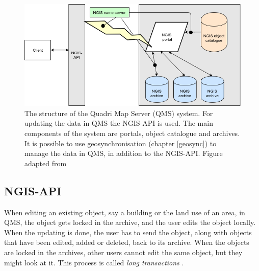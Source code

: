 \begin{figure}[H]
	\centering
	\includegraphics[scale=0.5]{img/ngiss.png}
	\caption{The structure of the Quadri Map Server (QMS) system. For updating the data in QMS the NGIS-API is used.  The main components of the system are portals, object catalogue and archives. It is possible to use geosynchronisation (chapter \ref{geosync}) to manage the data in QMS, in addition to the NGIS-API. Figure adapted from \citep{Kartverket2017b} }
	\label{fig:qmsfig}
\end{figure}

\subsection{NGIS-API}

When editing an existing object, say a building or the land use of an area, in QMS, the object gets locked in the archive, and the user edits the object locally. When the updating is done, the user has to send the object, along with objects that have been edited, added or deleted, back to its archive. When the objects are locked in the archives, other users cannot edit the same object, but they might look at it. This process is called \textit{long transactions} \citep{Kartverket2017b}.





